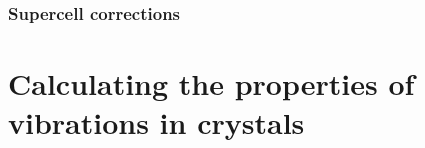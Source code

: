 \subsubsection{Supercell corrections}



\section{Calculating the properties of vibrations in crystals}








